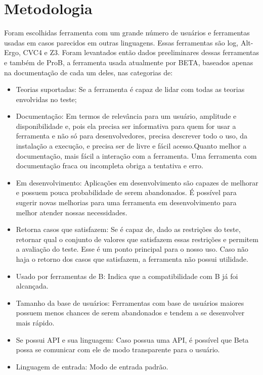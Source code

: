 \chapter{Metodologia}\label{chp:LABEL_CHP_3}

Foram escolhidas ferramenta com um grande número de usuários e ferramentas usadas em casos parecidos em outras linguagens. Essas ferramentas são {log}, Alt-Ergo, CVC4 e Z3. Foram levantados então dados preeliminares dessas ferramentas e também de ProB, a ferramenta usada atualmente por BETA, baseados apenas na documentação de cada um deles,  nas categorias de:
\begin{itemize}
	\item Teorias suportadas: Se a ferramenta é capaz de lidar com todas as teorias envolvidas no teste;
	\item Documentação: Em termos de relevância para um usuário, amplitude e disponibilidade e, pois ela precisa ser informativa para quem for usar a ferramenta e não só para desenvolvedores, precisa descrever todo o uso, da instalação a execução, e precisa ser de livre e fácil acesso.Quanto melhor a documentação, mais fácil a interação com a ferramenta. Uma ferramenta com documentação fraca ou incompleta obriga a tentativa e erro.	
	\item Em desenvolvimento: Aplicações em desenvolvimento são capazes de melhorar e possuem pouca probabilidade de serem abandonados. É possível para sugerir novas melhorias para uma ferramenta em desenvolvimento para melhor atender nossas necessidades.
	\item Retorna casos que satisfazem:  Se é capaz de, dado as restrições do teste, retornar qual o conjunto de valores que satisfazem essas restrições e permitem a avaliação do teste. Esse é  um ponto principal para o nosso uso. Caso não haja o retorno dos casos que satisfazem, a ferramenta não possui utilidade.
	\item Usado por ferramentas de B: Indica que a compatibilidade com B já foi alcançada.
	\item Tamanho da base de usuários: Ferramentas com base de usuários maiores possuem menos chances de serem abandonados e tendem a se desenvolver mais rápido.
	\item Se possui API e sua linguagem: Caso possua uma API, é possível que Beta possa se comunicar com ele de modo transparente para o usuário.
	\item Linguagem de entrada: Modo de entrada padrão.
\end{itemize}